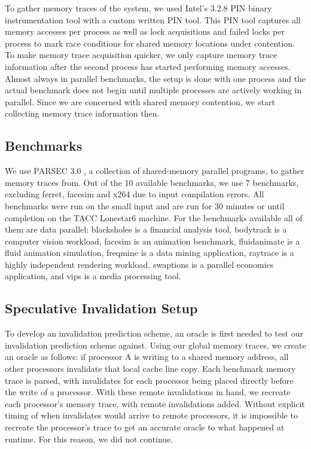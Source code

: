         To gather memory traces of the system, we used Intel's 3.2.8 PIN binary instrumentation tool with a custom written PIN tool. This PIN tool captures all memory accesses per process as well as lock acquisitions and failed locks per process to mark race conditions for shared memory locations under contention. To make memory trace acquisition quicker, we only capture memory trace information after the second process has started performing memory accesses. Almost always in parallel benchmarks, the setup is done with one process and the actual benchmark does not begin until multiple processes are actively working in parallel. Since we are concerned with shared memory contention, we start collecting memory trace information then.

    \subsection{Benchmarks}
        We use PARSEC 3.0 \cite{zhan_parsec3.0_2016}, a collection of shared-memory parallel programs, to gather memory traces from. Out of the 10 available benchmarks, we use 7 benchmarks, excluding ferret, facesim and x264 due to input compilation errors. All benchmarks were run on the small input and are run for 30 minutes or until completion on the TACC Lonestar6 machine. For the benchmarks available all of them are data parallel: blacksholes is a financial analysis tool, bodytrack is a computer vision workload, facesim is an animation benchmark, fluidanimate is a fluid animation simulation, freqmine is a data mining application, raytrace is a highly independent rendering workload, swaptions is a parallel economics application, and vips is a media processing tool.

    \subsection{Speculative Invalidation Setup}
        To develop an invalidation prediction scheme, an oracle is first needed to test our invalidation prediction scheme against. Using our global memory traces, we create an oracle as follows: if processor A is writing to a shared memory address, all other processors invalidate that local cache line copy. Each benchmark memory trace is parsed, with invalidates for each processor being placed directly before the write of a processor. With these remote invalidations in hand, we recreate each processor's memory trace, with remote invalidations added. Without explicit timing of when invalidates would arrive to remote processors, it is impossible to recreate the processor's trace to get an accurate oracle to what happened at runtime. For this reason, we did not continue.

